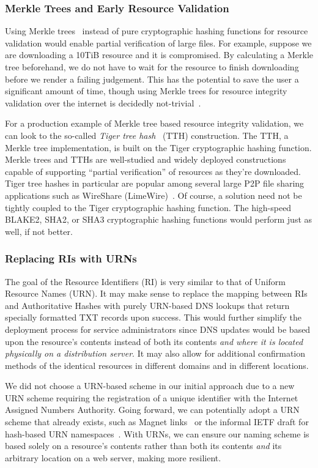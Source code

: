 \subsubsection{Merkle Trees and Early Resource Validation}

Using Merkle trees~\cite{Merkle} instead of pure cryptographic hashing functions
for resource validation would enable partial verification of large files. For
example, suppose we are downloading a 10TiB resource and it is compromised. By
calculating a Merkle tree beforehand, we do not have to wait for the resource to
finish downloading before we render a failing judgement. This has the potential
to save the user a significant amount of time, though using Merkle trees for
resource integrity validation over the internet is decidedly
not-trivial~\cite{Merkle-HTTP}.

For a production example of Merkle tree based resource integrity validation, we
can look to the so-called \emph{Tiger tree hash}~\cite{TTH, Merkle} (TTH)
construction. The TTH, a Merkle tree implementation, is built on the Tiger
cryptographic hashing function. Merkle trees and TTHs are well-studied and
widely deployed constructions capable of supporting ``partial verification'' of
resources as they're downloaded. Tiger tree hashes in particular are popular
among several large P2P file sharing applications such as WireShare
(LimeWire)~\cite{LimeWire}. Of course, a solution need not be tightly coupled to
the Tiger cryptographic hashing function. The high-speed BLAKE2, SHA2, or SHA3
cryptographic hashing functions would perform just as well, if not better.

\subsubsection{Replacing RIs with URNs}

The goal of the Resource Identifiers (RI) is very similar to that of Uniform
Resource Names (URN). It may make sense to replace the mapping between RIs and
Authoritative Hashes with purely URN-based DNS lookups that return specially
formatted TXT records upon success. This would further simplify the deployment
process for service administrators since DNS updates would be based upon the
resource's contents instead of both its contents \textit{and where it is located
physically on a distribution server}. It may also allow for additional
confirmation methods of the identical resources in different domains and in
different locations.

We did not choose a URN-based scheme in our initial approach due to a new URN
scheme requiring the registration of a unique identifier with the Internet
Assigned Numbers Authority. Going forward, we can potentially adopt a URN scheme
that already exists, such as Magnet links~\cite{MagnetLinks} or the informal
IETF draft for hash-based URN namespaces~\cite{draft-URN}. With URNs, we can
ensure our naming scheme is based solely on a resource's contents rather than
both its contents \emph{and} its arbitrary location on a web server, making
\SYSTEM{} more resilient.

